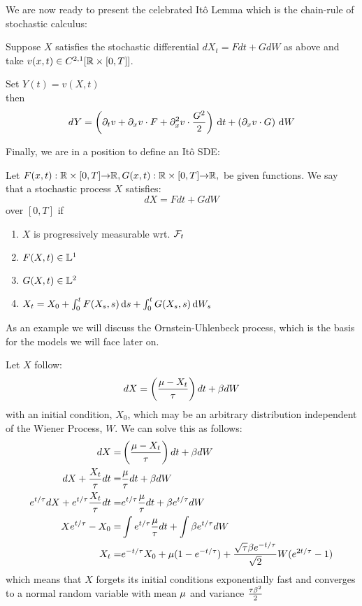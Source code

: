 We are now ready to present the celebrated It\^o Lemma which is the chain-rule of
stochastic calculus:

\begin{thm}[It\^o Lemma]
Suppose $X$ satisfies the stochastic differential $dX_t =
Fdt + G dW$ as above and take $v(x,t) \in C^{2,1}[ { \mathbb{R} } \times [0,T]]$.

Set $Y(t) = v(X,t)$
\\
then
$$
dY =  \left( {\partial}_t v + {\partial}_x v \cdot F + {\partial}^2_x v \cdot \frac{G^2}2 \right)
\, \mathrm{d} t + \left(   {\partial}_x v\cdot G  \right)\, \mathrm{d} W
$$
\end{thm} 

Finally, we are in a position to define an It\^o SDE:

\begin{defn}[It\^o SDE] Let
$F(x,t):{ \mathbb{R} }\times [0,T]{\rightarrow} { \mathbb{R} },  G(x,t):{ \mathbb{R} }\times [0,T]{\rightarrow} { \mathbb{R} },$ be given functions.
We say that a stochastic process $X$ satisfies:
\begin{equation}
dX =F dt + G dW
\end{equation} 
over $[0,T]$ if
\begin{enumerate}
  \item $X$ is progressively measurable wrt. ${\mathcal{F}}_t$
  \item $F(X,t) \in {\mathbb{L}^1}$
  \item $G(X,t) \in {\mathbb{L}^2}$ 
  \item $X_t = X_0 + \int_0^t F(X_s, s) \, \mathrm{d} s + \int_0^t G(X_s, s) \, \mathrm{d} W_s$
\end{enumerate}
\end{defn} 

As an example we will discuss the Ornstein-Uhlenbeck process, which is the
basis for the models we will face later on.
\begin{ex}[O-U Process] Let $X$ follow:
\begin{equation}
dX = \left( \frac {{\mu } -X_t}{{ \tau }} \right) dt + \beta dW
\label{eq:OU_equation_generic}
\end{equation}
with an initial condition, $X_0$, which may be an arbitrary distribution
independent of the Wiener Process, $W$.
We can solve this as follows:
\begin{align*}
dX =& \left( \frac {{\mu } -X_t}{{ \tau }} \right)  dt + \beta dW
\\
dX + \frac {X_t}{{ \tau }} dt=&  \frac{{\mu }}{{ \tau }} dt + \beta dW
\\
e^{t/{ \tau }} dX + e^{t/{ \tau }}\frac {X_t}{{ \tau }} dt
=& e^{t/{ \tau }}\frac{{\mu }}{{ \tau }} dt + \beta e^{t/{ \tau }} dW
\\
Xe^{t/{ \tau }} - X_0 
=& \int  e^{t/{ \tau }}\frac{{\mu }}{{ \tau }} dt +  \int \beta e^{t/{ \tau }} dW
\\
X_t =& e^{-t/{ \tau }} X_0 + {\mu }(1-e^{-t/{ \tau }}) +  \frac{\sqrt{{ \tau }}\beta
e^{-t/{ \tau }}}{\sqrt{2}} W(e^{2t/{ \tau }}-1)
\end{align*}
which means that $X$ forgets its initial conditions exponentially fast and
converges to a normal random variable with mean ${\mu }$ and variance
$\tfrac{{ \tau } \beta^2}{2}$
\end{ex}

